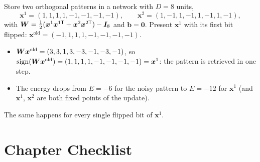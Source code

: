 \documentclass[11pt, oneside]{book}
\DeclareMathOperator{\sign}{sign}
\newcommand{\bx}{\bm{x}}        \newcommand{\by}{\bm{y}}
\newcommand{\bb}{\bm{b}}        \newcommand{\bh}{\bm{h}}
\newcommand{\bI}{\bm{I}}        \newcommand{\bJ}{\bm{J}}
\let\originalsection\section
\renewcommand{\section}{\Needspace{7\baselineskip}\originalsection}
\begin{document}
\begin{exbox}[title={Retrieving a pattern with one flipped bit}]
Store two orthogonal patterns in a network with $D = 8$ units,
\[
  \bx^1 = (1, 1, 1, 1, -1, -1, -1, -1), \qquad
  \bx^2 = (1, -1, 1, -1, 1, -1, 1, -1),
\]
with $\bW = \frac12(\bx^1\bx^{1\mathsf{T}} + \bx^2\bx^{2\mathsf{T}}) - \bI_8$
and $\bb = \bm{0}$.
Present $\bx^1$ with its first bit flipped:
$\bx^{\text{old}} = (-1, 1, 1, 1, -1, -1, -1, -1)$.
\begin{itemize}
  \item $\bW\bx^{\text{old}} = (3, 3, 1, 3, -3, -1, -3, -1)$, so
    $\sign(\bW\bx^{\text{old}}) = (1, 1, 1, 1, -1, -1, -1, -1) = \bx^1$: the
    pattern is retrieved in one step.
  \item The energy drops from $E = -6$ for the noisy pattern to $E = -12$ for
    $\bx^1$ (and $\bx^1$, $\bx^2$ are both fixed points of the update).
\end{itemize}
The same happens for every single flipped bit of $\bx^1$.
\end{exbox}


\section{Chapter Checklist}
\end{document}
